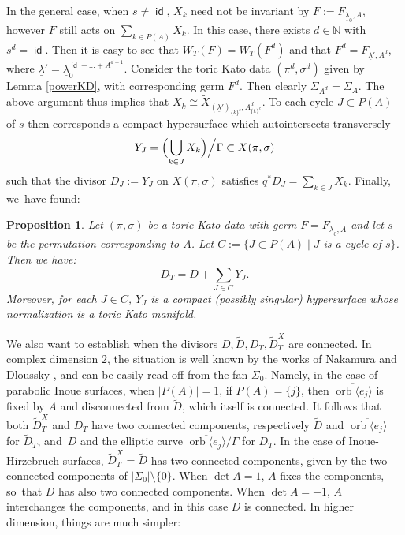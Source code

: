 \documentclass[JEP,XML,SOM,Unicode,NoFloatCountersInSection]{cedram}
\newtheorem{proposition}[theorem]{Proposition}
\theoremstyle{definition}
\let\wt\widetilde
\let\la\lambda
\let\ov\overline
\let\sminus\setminus
\let\un\underline
\newcommand{\NN}{\mathbb{N}}
\DeclareMathOperator{\id}{\mathsf{id}}
\DeclareMathOperator{\orb}{orb}
\begin{document}
In the general case, \ie when $s\neq\id$, $X_k$ need not be invariant by $F:=F_{\un\la_0,A}$, however $F$ still acts on $\sum_{k\in P(A)} X_k$. In this case, there exists $d\in\NN$ with $s^d=\id$. Then it is easy to see that $W_T(F)=W_T(F^d)$ and that $F^d=F_{\un\la',A^d}$, where $\un\la'=\un\la_0^{\id+\ldots+A^{d-1}}$. Consider the toric Kato data $(\pi^d,\sigma^d)$ given by Lemma \ref{powerKD}, with corresponding germ $F^d$. Then clearly $\Sigma_{A^d}=\Sigma_A$. The above argument thus implies that $X_k\cong\wt{X}_{(\un\la')_{\{k\}^c},A^d_{\{k\}^c}}$. To each cycle $J\subset P(A)$ of $s$ then corresponds a compact hypersurface which autointersects transversely
\begin{equation*}
Y_{J}=\Bigl(\bigcup_{k\in J} X_k\Bigr)\Big/\Gamma\subset X(\pi,\sigma)
\end{equation*}
such that the divisor $D_J:=Y_J$ on $X(\pi,\sigma)$ satisfies $q^*D_J=\sum_{k\in J}X_k$.
Finally, we~have found:

\begin{proposition}\label{divD'}
Let $(\pi,\sigma)$ be a toric Kato data with germ $F=F_{\un\la_0,A}$ and let $s$ be the permutation corresponding to $A$. Let $C:=\{J\subset P(A)\mid J$ is a cycle of $s\}$. Then we have:
\begin{equation*}
D_T=D+\sum_{J\in C}Y_J.
\end{equation*}
Moreover, for each $J\in C$, $Y_J$ is a compact (possibly singular) hypersurface whose normalization is a toric Kato manifold.
\end{proposition}

We also want to establish when the divisors $D,\wt{D}, D_T, \wt{D}^X_T$ are connected. In complex dimension $2$, the situation is well known by the works of Nakamura \cite{naka84} and Dloussky \cite{dl84}, and can be easily read off from the fan $\Sigma_0$. Namely, in the case of parabolic Inoue surfaces, \ie when $|P(A)|=1$, if $P(A)=\{j\}$, then $\ov{\orb\langle e_j\rangle}$ is fixed by $A$ and disconnected from $\wt{D}$, which itself is connected. It follows that both $\wt{D}^X_T$ and $D_T$ have two connected components, respectively $\wt{D}$ and $\ov{\orb\langle e_j\rangle}$ for $\wt{D}_T$, and~$D$ and the elliptic curve $\ov{\orb\langle e_j\rangle}/\Gamma$ for $D_T$. In the case of Inoue-Hirzebruch surfaces, $\wt{D}^X_T=\wt{D}$ has two connected components, given by the two connected components of $|\Sigma_0|\sminus\{0\}$. When $\det A=1$, $A$ fixes the components, so~that $D$ has also two connected components. When $\det A=-1$, $A$ interchanges the components, and in this case $D$ is connected. In higher dimension, things are much simpler:
\end{document}
